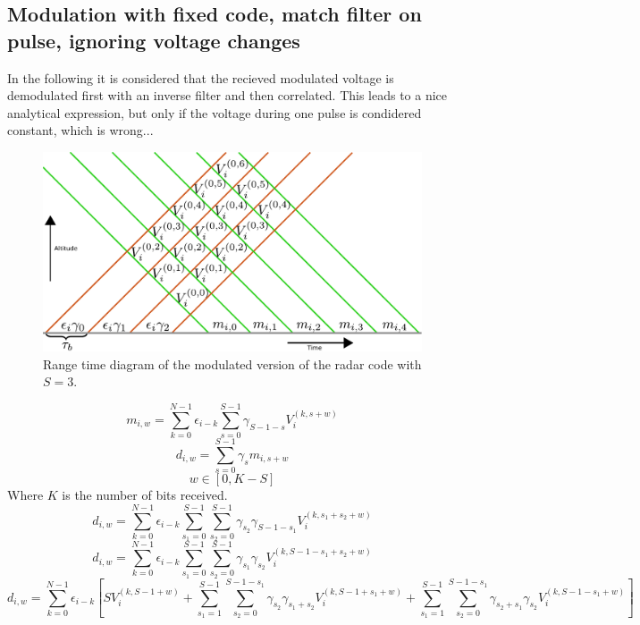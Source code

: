 \documentclass[18pt,a4paper]{extarticle}
\begin{document}
\subsection{Modulation with fixed code, match filter on pulse, ignoring voltage changes}
In the following it is considered that the recieved modulated voltage is demodulated first with an inverse filter and then correlated.
This leads to a nice analytical expression, but only if the voltage during one pulse is condidered constant, which is wrong...
\begin{figure}
	\centering
	\includegraphics[width=1\linewidth]{code_diagram_modulated.pdf}
	\caption{Range time diagram of the modulated version of the radar code with $S=3$.}
	\label{fig:modulated}
\end{figure}
\begin{equation}
m_{i,w} = \sum_{k=0}^{N-1} \epsilon_{i-k} \sum_{s=0}^{S-1} \gamma_{S-1-s} V^{(k, s + w)}_{i}
\end{equation}
\begin{equation}
d_{i,w} = \sum^{S-1}_{s=0} \gamma_{s} m_{i, s + w}
\end{equation}
\begin{equation}
w \in [0, K - S]
\end{equation}
Where $K$ is the number of bits received.
\begin{equation}
d_{i,w} = \sum_{k=0}^{N-1}\epsilon_{i-k} \sum_{s_1=0}^{S-1} \sum^{S-1}_{s_2=0} \gamma_{s_2} \gamma_{S-1-s_1} V_i^{(k, s_1 + s_2 + w)}
\end{equation}
\begin{equation}
d_{i,w} = \sum_{k=0}^{N-1}\epsilon_{i-k} \sum_{s_1=0}^{S-1} \sum^{S-1}_{s_2=0} \gamma_{s_1} \gamma_{s_2} V_i^{(k, S - 1 - s_1 + s_2 + w)}
\end{equation}
\begin{equation}
d_{i,w} = \sum_{k=0}^{N-1}\epsilon_{i-k}\left[SV_i^{(k, S - 1 + w)}
+ \sum_{s_1=1}^{S-1} \sum^{S-1-s_1}_{s_2=0} \gamma_{s_2} \gamma_{s_1 + s_2} V_i^{(k, S - 1 + s_1 + w)}
+ \sum_{s_1=1}^{S-1} \sum^{S-1-s_1}_{s_2=0} \gamma_{s_2+s_1} \gamma_{s_2} V_i^{(k, S - 1 - s_1 + w)} \right]
\end{equation}
\end{document}
